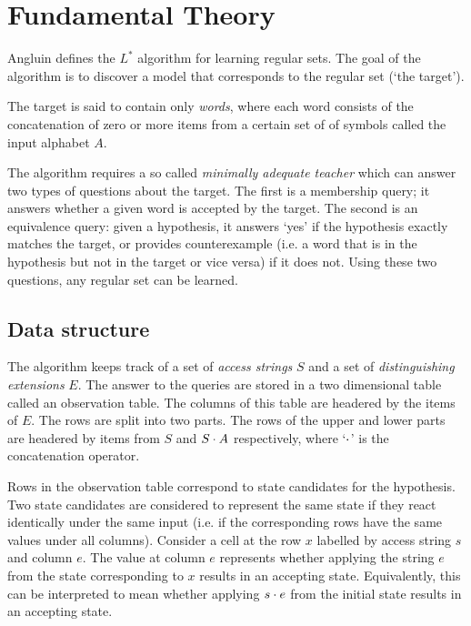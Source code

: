 \documentclass[multi,crop=false,class=article]{standalone}
\begin{document}
\section{Fundamental Theory}
\label{sec:fundamental-theory}

Angluin defines the $L^*$ algorithm for learning regular sets\cite{Angluin87}.
The goal of the algorithm is to discover a model that corresponds to the regular
set (`the target').

The target is said to contain only \textit{words}, where each word consists
of the concatenation of zero or more items from a certain set of of symbols
called the input alphabet $A$.

The algorithm requires a so called \textit{minimally adequate teacher} which can
answer two types of questions about the target. The first is a membership query;
it answers whether a given word is accepted by the target. The second is an
equivalence query: given a hypothesis, it answers `yes' if the hypothesis
exactly matches the target, or provides counterexample (i.e. a word that is in
the hypothesis but not in the target or vice versa) if it does not. Using these
two questions, any regular set can be learned.

\subsection {Data structure}

The algorithm keeps track of a set of \textit{access strings} $S$ and a set of
\textit{distinguishing extensions} $E$. The answer to the queries are stored in
a two dimensional table called an observation table. The columns of this table
are headered by the items of $E$. The rows are split into two parts. The rows of
the upper and lower parts are headered by items from $S$ and $S \cdot A$
respectively, where `$\cdot$' is the concatenation operator. 

Rows in the observation table correspond to state candidates for the hypothesis.
Two state candidates are considered to represent the same state if they react
identically under the same input (i.e. if the corresponding rows have the same
values under all columns). Consider a cell at the row $x$ labelled by access
string $s$ and column $e$. The value at column $e$ represents whether applying
the string $e$ from the state corresponding to $x$ results in an accepting
state. Equivalently, this can be interpreted to mean whether applying $s \cdot
e$ from the initial state results in an accepting state.
\end{document}
